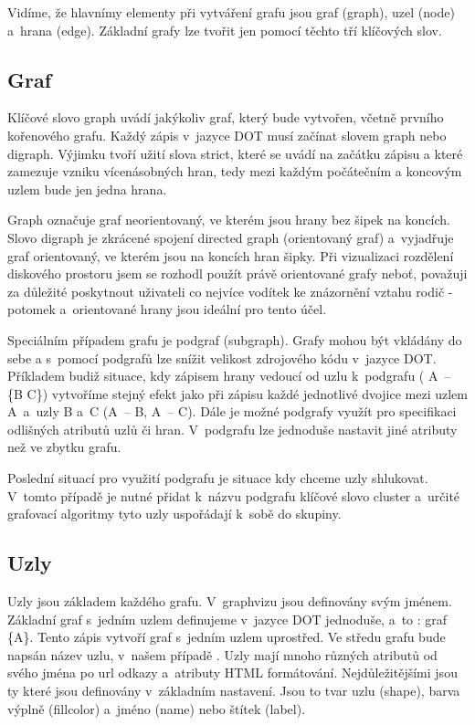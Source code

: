 \documentclass[color,table,oneside,nolot,nolof]{fithesis}
\begin{document}
	Vidíme, že hlavnímy elementy při vytváření grafu jsou graf (graph), uzel (node) a~hrana (edge). Základní grafy lze tvořit jen pomocí těchto tří klíčových slov.

\subsection{Graf}
	Klíčové slovo graph uvádí jakýkoliv graf, který bude vytvořen, včetně prvního kořenového grafu. Každý zápis v~jazyce DOT musí začínat slovem graph nebo digraph. Výjimku tvoří užití slova
	strict, které se uvádí na začátku zápisu a které zamezuje vzniku vícenásobných hran, tedy mezi každým počátečním a koncovým uzlem bude jen jedna hrana. 

	Graph označuje graf neorientovaný, ve kterém jsou hrany bez šipek na koncích. Slovo digraph je zkrácené spojení directed graph (orientovaný
	graf) a~vyjadřuje graf orientovaný, ve kterém jsou na koncích hran šipky. Při vizualizaci rozdělení diskového prostoru jsem se rozhodl použít právě orientované grafy neboť, považuji za 
	důležité poskytnout uživateli co nejvíce vodítek ke znázornění vztahu rodič - potomek a~orientované hrany jsou ideální pro tento účel. 

	Speciálním případem grafu je podgraf (subgraph). Grafy mohou být vkládány do sebe a s~pomocí podgrafů lze snížit velikost zdrojového kódu v~jazyce DOT. Příkladem budiž situace, kdy zápisem
	hrany vedoucí od uzlu k~podgrafu ( A~-- \{B C\}) vytvoříme stejný efekt jako při zápisu každé jednotlivé dvojice mezi uzlem A~a~uzly B a~C (A~-- B, A~-- C). Dále je možné podgrafy využít
	pro specifikaci odlišných atributů uzlů či hran. V~podgrafu lze jednoduše nastavit jiné atributy než ve zbytku grafu.

	Poslední situací pro využití podgrafu je situace kdy chceme uzly shlukovat. V~tomto případě je nutné přidat k~názvu podgrafu klíčové slovo cluster a~určité grafovací algoritmy tyto uzly 
	uspořádají k~sobě do skupiny.

\subsection{Uzly}
	Uzly jsou základem každého grafu. V~graphvizu jsou definovány svým jménem. Základní graf s~jedním uzlem definujeme v~jazyce DOT jednoduše, a~to : graf \{A\}. Tento zápis vytvoří
	graf s~jedním uzlem uprostřed. Ve středu grafu bude napsán název uzlu, v~našem případě . Uzly mají mnoho různých atributů od svého jména po url odkazy a~atributy HTML formátování. 
	Nejdůležitějšími jsou ty které jsou definovány v~základním nastavení. Jsou to tvar uzlu (shape), barva výplně (fillcolor) a~jméno (name) nebo štítek (label). 
	
\end{document}
